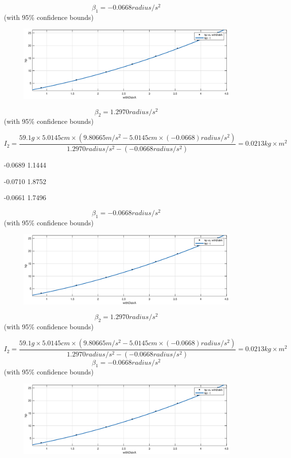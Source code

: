 $$ \beta_1 = -0.0668 radius/s^2$$ (with 95\% confidence bounds) 

\begin{figure}[H]
\centering
\includegraphics[width=\EFWwr]{matlab/wda}
\end{figure}

$$ \beta_2 = 1.2970 radius/s^2$$ (with 95\% confidence bounds) 

$$ I_2 = \frac{59.1 g \times 5.0145 cm \times (9.80665 m/s^2 - 5.0145 cm \times (-0.0668) radius/s^2 )}{1.2970 radius/s^2 -(-0.0668 radius/s^2) } = 0.0213 kg\times m^2 $$



-0.0689
1.1444

-0.0710
1.8752

-0.0661
1.7496


$$ \beta_1 = -0.0668 radius/s^2$$ (with 95\% confidence bounds) 

\begin{figure}[H]
\centering
\includegraphics[width=\EFWwr]{matlab/wda}
\end{figure}

$$ \beta_2 = 1.2970 radius/s^2$$ (with 95\% confidence bounds) 

$$ I_2 = \frac{59.1 g \times 5.0145 cm \times (9.80665 m/s^2 - 5.0145 cm \times (-0.0668) radius/s^2 )}{1.2970 radius/s^2 -(-0.0668 radius/s^2) } = 0.0213 kg\times m^2 $$$$ \beta_1 = -0.0668 radius/s^2$$ (with 95\% confidence bounds) 

\begin{figure}[H]
\centering
\includegraphics[width=\EFWwr]{matlab/wda}
\end{figure}

